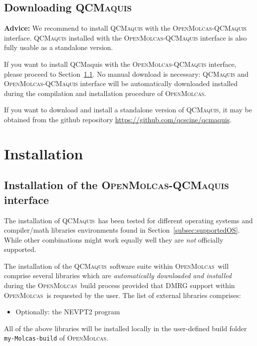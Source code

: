 \documentclass[bibliography=totoc,12pt,a4paper]{scrartcl}
\newcommand{\mol}{\textsc{OpenMolcas}}
\newcommand{\qcm}{\textsc{QCMaquis}}
\begin{document}
\subsection{Downloading \qcm{}}\label{sec:reg}

\begin{framed}
\noindent \textbf{Advice:} We recommend to install \qcm{} with the \mol-\qcm{} interface.
\qcm{} installed with the \mol-\qcm{} interface is also fully usable as a standalone version.
\end{framed}

If you want to install QCMaquis with the \mol-\qcm{} interface, please proceed to Section~\ref{sec:install-qcm-mol}. No manual download is necessary: \qcm{} and \mol-\qcm{} interface will be automatically downloaded installed during the compilation and installation procedure of \mol{}.

If you want to download and install a standalone version of \qcm{}, it may be obtained from the github repository \url{https://github.com/qcscine/qcmaquis}.

\clearpage
\newpage

\section{Installation}
\label{sec:installation}

\subsection{Installation of the \mol-\qcm{} interface}
\label{sec:install-qcm-mol}

The installation of \qcm\ has been tested for different operating systems and compiler/math libraries environments found in Section~\ref{subsec:supportedOS}.
While other combinations might work equally well they are \emph{not} officially supported.

\noindent The installation of the \qcm\ software suite within \mol\ will comprise several libraries which are \emph{automatically downloaded and installed} during the \mol\ build process provided that DMRG support within \mol\ is requested by the user.
The list of external libraries comprises:

\begin{itemize}
  \item Optionally: the NEVPT2 program
\end{itemize}

All of the above libraries will be installed locally in the user-defined build folder \texttt{my-Molcas-build} of \mol.
\end{document}
